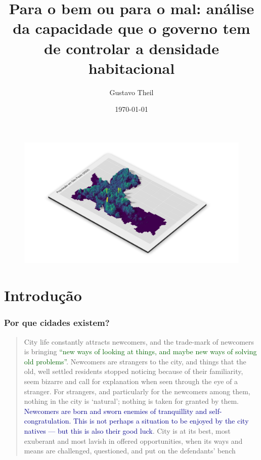 \documentclass[%
    9pt, 
    aspectratio=169,
]{beamer}
\title{Para o bem ou para o mal: \newline análise da capacidade que o governo tem de controlar a densidade habitacional}
\author{Gustavo Theil}
\date{\today}
\begin{document}
\begin{frame}[plain]{}
    \begin{figure}
        \includegraphics[width = \paperwidth, height = \paperheight]{imagens/mapa3d.png}
    \end{figure}
\end{frame}

\frame{\titlepage}


\section{Introdução}

\begin{frame}
    \frametitle{Por que cidades existem?}
    \begin{quote}
        City life constantly attracts newcomers, and the trade-mark of newcomers is bringing \textcolor{DarkGreen}{``new ways of looking at things, and maybe new ways of solving old problems''}. Newcomers are strangers to the city, and things that the old, well settled residents stopped noticing because of their familiarity, seem bizarre and call for explanation when seen through the eye of a stranger. For strangers, and particularly for the newcomers among them, nothing in the city is `natural'; nothing is taken for granted by them. \textcolor{DarkBlue}{Newcomers are born and sworn enemies of tranquillity and self-congratulation. This is not perhaps a situation to be enjoyed by the city natives --- but this is also their good luck}. City is at its best, most exuberant and most lavish in offered opportunities, when its ways and means are challenged, questioned, and put on the defendants' bench

    \end{quote}
\end{frame}
\end{document}
